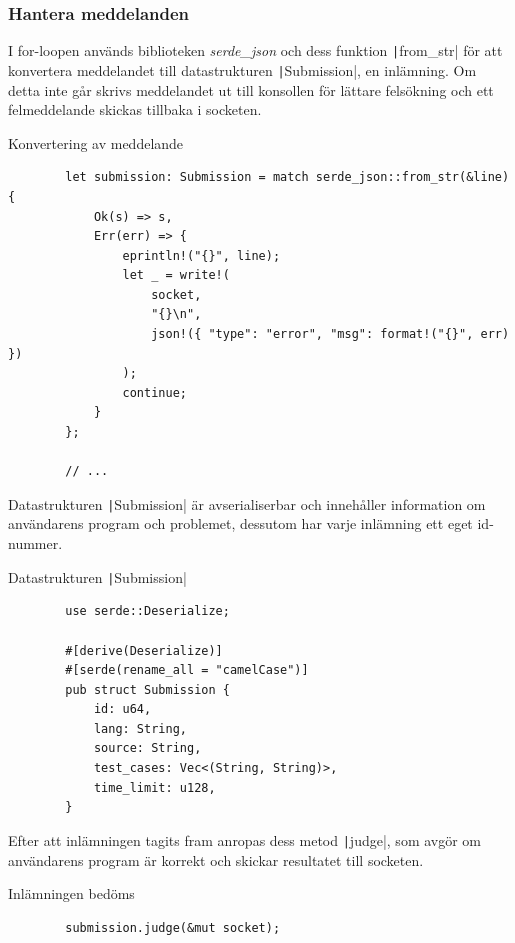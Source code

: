 \documentclass{article}
\begin{document}
\subsubsection{Hantera meddelanden}

I for-loopen används biblioteken \textit{serde\_json} och dess funktion
\texttt|from_str| för att konvertera meddelandet till
datastrukturen \texttt|Submission|, en inlämning. Om
detta inte går skrivs meddelandet ut till konsollen för lättare felsökning och
ett felmeddelande skickas tillbaka i socketen.

\begin{listing}[H]
	\caption{Konvertering av meddelande}
	\begin{verbatim}
		let submission: Submission = match serde_json::from_str(&line) {
			Ok(s) => s,
			Err(err) => {
				eprintln!("{}", line);
				let _ = write!(
					socket,
					"{}\n",
					json!({ "type": "error", "msg": format!("{}", err) })
				);
				continue;
			}
		};

		// ...
	\end{verbatim}
\end{listing}

Datastrukturen \texttt|Submission| är avserialiserbar och innehåller information
om användarens program och problemet, dessutom har varje inlämning ett eget
id-nummer.

\begin{listing}[H]
	\caption{Datastrukturen \texttt|Submission|}
	\begin{verbatim}
		use serde::Deserialize;

		#[derive(Deserialize)]
		#[serde(rename_all = "camelCase")]
		pub struct Submission {
			id: u64,
			lang: String,
			source: String,
			test_cases: Vec<(String, String)>,
			time_limit: u128,
		}
	\end{verbatim}
\end{listing}

Efter att inlämningen tagits fram anropas dess metod
\texttt|judge|, som avgör
om användarens program är korrekt och skickar resultatet till socketen.

\begin{listing}[H]
	\caption{Inlämningen bedöms \label{call-judge}}
	\begin{verbatim}
        submission.judge(&mut socket);
	\end{verbatim}
\end{listing}
\end{document}
